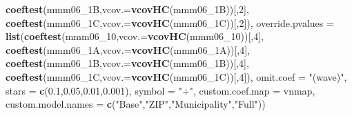 \documentclass[
]{article}
\newenvironment{Shaded}{\begin{snugshade}}{\end{snugshade}}
\newcommand{\DataTypeTok}[1]{\textcolor[rgb]{0.13,0.29,0.53}{#1}}
\newcommand{\DecValTok}[1]{\textcolor[rgb]{0.00,0.00,0.81}{#1}}
\newcommand{\FloatTok}[1]{\textcolor[rgb]{0.00,0.00,0.81}{#1}}
\newcommand{\KeywordTok}[1]{\textcolor[rgb]{0.13,0.29,0.53}{\textbf{#1}}}
\newcommand{\NormalTok}[1]{#1}
\newcommand{\StringTok}[1]{\textcolor[rgb]{0.31,0.60,0.02}{#1}}
\begin{document}
\begin{Shaded}
\begin{Highlighting}[]
                             \KeywordTok{coeftest}\NormalTok{(mmm06_1B,}\DataTypeTok{vcov.=}\KeywordTok{vcovHC}\NormalTok{(mmm06_1B))[,}\DecValTok{2}\NormalTok{],}
                             \KeywordTok{coeftest}\NormalTok{(mmm06_1C,}\DataTypeTok{vcov.=}\KeywordTok{vcovHC}\NormalTok{(mmm06_1C))[,}\DecValTok{2}\NormalTok{]),}
          \DataTypeTok{override.pvalues =} \KeywordTok{list}\NormalTok{(}\KeywordTok{coeftest}\NormalTok{(mmm06_}\DecValTok{10}\NormalTok{,}\DataTypeTok{vcov.=}\KeywordTok{vcovHC}\NormalTok{(mmm06_}\DecValTok{10}\NormalTok{))[,}\DecValTok{4}\NormalTok{],}
                                  \KeywordTok{coeftest}\NormalTok{(mmm06_1A,}\DataTypeTok{vcov.=}\KeywordTok{vcovHC}\NormalTok{(mmm06_1A))[,}\DecValTok{4}\NormalTok{],}
                                  \KeywordTok{coeftest}\NormalTok{(mmm06_1B,}\DataTypeTok{vcov.=}\KeywordTok{vcovHC}\NormalTok{(mmm06_1B))[,}\DecValTok{4}\NormalTok{],}
                                  \KeywordTok{coeftest}\NormalTok{(mmm06_1C,}\DataTypeTok{vcov.=}\KeywordTok{vcovHC}\NormalTok{(mmm06_1C))[,}\DecValTok{4}\NormalTok{]),}
          \DataTypeTok{omit.coef =} \StringTok{"(wave)"}\NormalTok{, }\DataTypeTok{stars =} \KeywordTok{c}\NormalTok{(}\FloatTok{0.1}\NormalTok{,}\FloatTok{0.05}\NormalTok{,}\FloatTok{0.01}\NormalTok{,}\FloatTok{0.001}\NormalTok{), }\DataTypeTok{symbol =} \StringTok{"+"}\NormalTok{,}
          \DataTypeTok{custom.coef.map =}\NormalTok{ vnmap, }
          \DataTypeTok{custom.model.names =} \KeywordTok{c}\NormalTok{(}\StringTok{"Base"}\NormalTok{,}\StringTok{"ZIP"}\NormalTok{,}\StringTok{"Municipality"}\NormalTok{,}\StringTok{"Full"}\NormalTok{))}
\end{Highlighting}
\end{Shaded}
\end{document}
